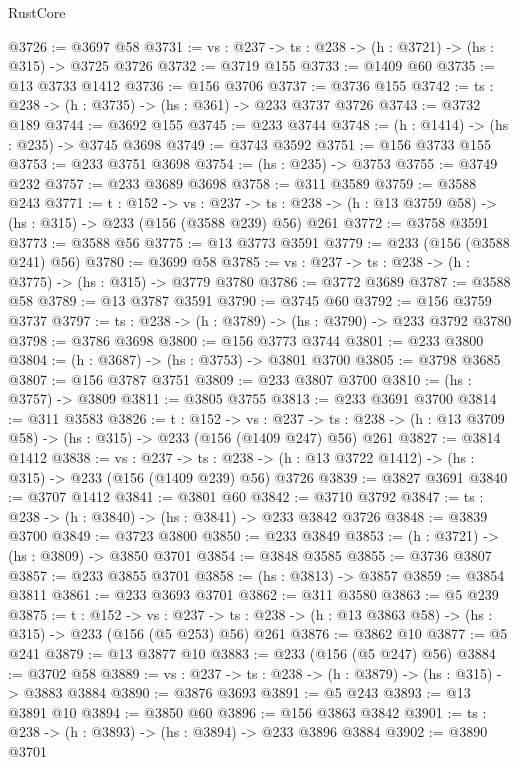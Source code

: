 \begin{lexlean}{RustCore}
\begin{coremodule}
@3726 := @3697 @58
@3731 := {vs : @237} -> {ts : @238} -> (h : @3721) -> (hs : @315) -> @3725 @3726
@3732 := @3719 @155
@3733 := @1409 @60
@3735 := @13 @3733 @1412
@3736 := @156 @3706
@3737 := @3736 @155
@3742 := {ts : @238} -> (h : @3735) -> (hs : @361) -> @233 @3737 @3726
@3743 := @3732 @189
@3744 := @3692 @155
@3745 := @233 @3744
@3748 := (h : @1414) -> (hs : @235) -> @3745 @3698
@3749 := @3743 @3592
@3751 := @156 @3733 @155
@3753 := @233 @3751 @3698
@3754 := (hs : @235) -> @3753
@3755 := @3749 @232
@3757 := @233 @3689 @3698
@3758 := @311 @3589
@3759 := @3588 @243
@3771 := {t : @152} ->
  {vs : @237} ->
  {ts : @238} -> (h : @13 @3759 @58) -> (hs : @315) -> @233 (@156 (@3588 @239) @56) @261
@3772 := @3758 @3591
@3773 := @3588 @56
@3775 := @13 @3773 @3591
@3779 := @233 (@156 (@3588 @241) @56)
@3780 := @3699 @58
@3785 := {vs : @237} -> {ts : @238} -> (h : @3775) -> (hs : @315) -> @3779 @3780
@3786 := @3772 @3689
@3787 := @3588 @58
@3789 := @13 @3787 @3591
@3790 := @3745 @60
@3792 := @156 @3759 @3737
@3797 := {ts : @238} -> (h : @3789) -> (hs : @3790) -> @233 @3792 @3780
@3798 := @3786 @3698
@3800 := @156 @3773 @3744
@3801 := @233 @3800
@3804 := (h : @3687) -> (hs : @3753) -> @3801 @3700
@3805 := @3798 @3685
@3807 := @156 @3787 @3751
@3809 := @233 @3807 @3700
@3810 := (hs : @3757) -> @3809
@3811 := @3805 @3755
@3813 := @233 @3691 @3700
@3814 := @311 @3583
@3826 := {t : @152} ->
  {vs : @237} ->
  {ts : @238} -> (h : @13 @3709 @58) -> (hs : @315) -> @233 (@156 (@1409 @247) @56) @261
@3827 := @3814 @1412
@3838 := {vs : @237} ->
  {ts : @238} -> (h : @13 @3722 @1412) -> (hs : @315) -> @233 (@156 (@1409 @239) @56) @3726
@3839 := @3827 @3691
@3840 := @3707 @1412
@3841 := @3801 @60
@3842 := @3710 @3792
@3847 := {ts : @238} -> (h : @3840) -> (hs : @3841) -> @233 @3842 @3726
@3848 := @3839 @3700
@3849 := @3723 @3800
@3850 := @233 @3849
@3853 := (h : @3721) -> (hs : @3809) -> @3850 @3701
@3854 := @3848 @3585
@3855 := @3736 @3807
@3857 := @233 @3855 @3701
@3858 := (hs : @3813) -> @3857
@3859 := @3854 @3811
@3861 := @233 @3693 @3701
@3862 := @311 @3580
@3863 := @5 @239
@3875 := {t : @152} ->
  {vs : @237} -> {ts : @238} -> (h : @13 @3863 @58) -> (hs : @315) -> @233 (@156 (@5 @253) @56) @261
@3876 := @3862 @10
@3877 := @5 @241
@3879 := @13 @3877 @10
@3883 := @233 (@156 (@5 @247) @56)
@3884 := @3702 @58
@3889 := {vs : @237} -> {ts : @238} -> (h : @3879) -> (hs : @315) -> @3883 @3884
@3890 := @3876 @3693
@3891 := @5 @243
@3893 := @13 @3891 @10
@3894 := @3850 @60
@3896 := @156 @3863 @3842
@3901 := {ts : @238} -> (h : @3893) -> (hs : @3894) -> @233 @3896 @3884
@3902 := @3890 @3701

\end{coremodule}
\end{lexlean}
